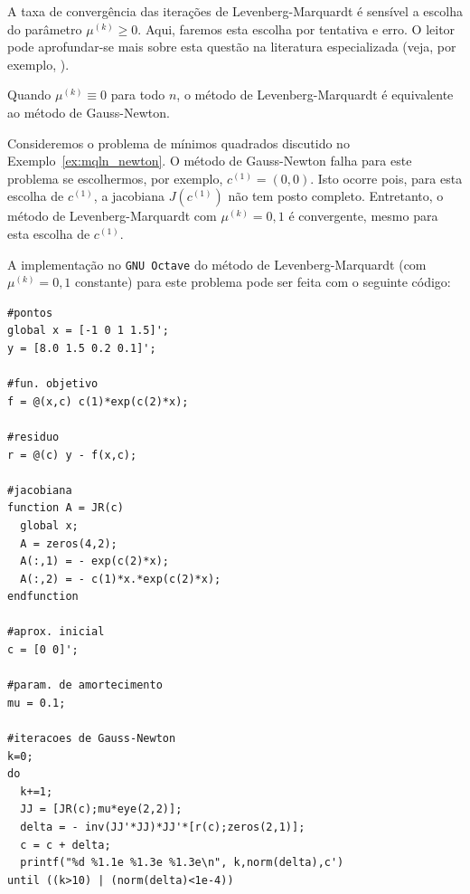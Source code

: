 A taxa de convergência das iterações de Levenberg-Marquardt é sensível a escolha do parâmetro $\mu^{(k)}\geq 0$. Aqui, faremos esta escolha por tentativa e erro. O leitor pode aprofundar-se mais sobre esta questão na literatura especializada (veja, por exemplo, \cite{Bjorck1996a,Nocedal2006a}).

\begin{obs}
  Quando $\mu^{(k)} \equiv 0$ para todo $n$, o método de Levenberg-Marquardt é equivalente ao método de Gauss-Newton.
\end{obs}

\begin{ex}\label{ex:mqnl_LM}
  Consideremos o problema de mínimos quadrados discutido no Exemplo~\ref{ex:mqln_newton}. O método de Gauss-Newton falha para este problema se escolhermos, por exemplo, $c^{(1)} = (0, 0)$. Isto ocorre pois, para esta escolha de $c^{(1)}$, a jacobiana $J(c^{(1)})$ não tem posto completo. Entretanto, o método de Levenberg-Marquardt com $\mu^{(k)} = 0,1$ é convergente, mesmo para esta escolha de $c^{(1)}$.

\ifisoctave
A implementação no \verb+GNU Octave+ do método de Levenberg-Marquardt (com $\mu^{(k)}=0,1$ constante) para este problema pode ser feita com o seguinte código:
\begin{verbatim}
#pontos
global x = [-1 0 1 1.5]';
y = [8.0 1.5 0.2 0.1]';

#fun. objetivo
f = @(x,c) c(1)*exp(c(2)*x);

#residuo
r = @(c) y - f(x,c);

#jacobiana
function A = JR(c)
  global x;
  A = zeros(4,2);
  A(:,1) = - exp(c(2)*x);
  A(:,2) = - c(1)*x.*exp(c(2)*x);
endfunction

#aprox. inicial
c = [0 0]';

#param. de amortecimento
mu = 0.1;

#iteracoes de Gauss-Newton
k=0;
do
  k+=1;
  JJ = [JR(c);mu*eye(2,2)];
  delta = - inv(JJ'*JJ)*JJ'*[r(c);zeros(2,1)];
  c = c + delta;
  printf("%d %1.1e %1.3e %1.3e\n", k,norm(delta),c')
until ((k>10) | (norm(delta)<1e-4))
\end{verbatim}
\fi
\end{ex}


\emconstrucao
